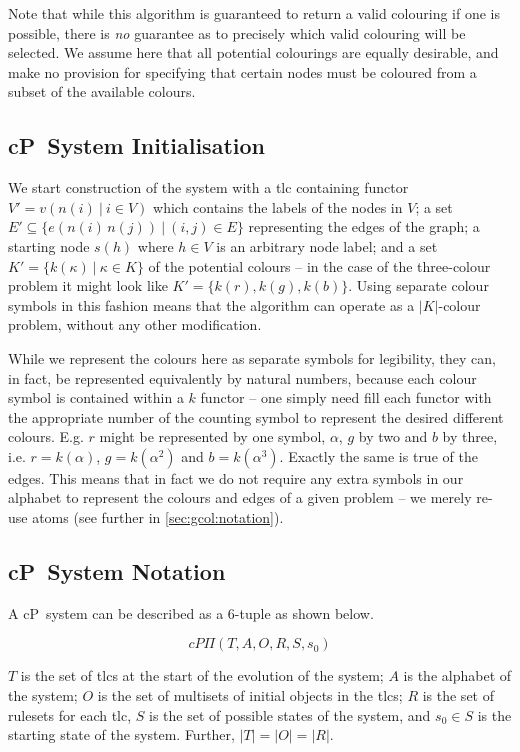 Note that while this algorithm is guaranteed to return a valid colouring if one is possible, there is \emph{no} guarantee as to precisely which valid colouring will be selected.  We assume here that all potential colourings are equally desirable, and make no provision for specifying that certain nodes must be coloured from a subset of the available colours.

\subsection{\label{sec:gcol:sysinit}cP~System Initialisation}
We start construction of the system with a \gls{tlc} containing functor \(V' = v(n(i)~|~i \in V)\) which contains the labels of the nodes in \(V\); a set \(E' \subseteq \{e(n(i)\,n(j))~|~(i,j) \in E\}\) representing the edges of the graph; a starting node \(s(h)\) where \(h \in V\) is an arbitrary node label; and a set \(K' = \{k(\kappa)~|~\kappa \in K\}\) of  the potential colours -- in the case of the three-colour problem it might look like \(K' = \{k(r), k(g), k(b)\}\). Using separate colour symbols in this fashion means that the algorithm can operate as a \(|K|\)-colour problem, without any other modification.

While we represent the colours here as separate symbols for legibility, they can, in fact, be represented equivalently by natural numbers, because each colour symbol is contained within a \(k\) functor -- one simply need fill each functor with the appropriate number of the counting symbol to represent the desired different colours.  E.g. \(r\) might be represented by one symbol, \(\alpha\), \(g\) by two and \(b\) by three, i.e. \(r = k(\alpha)\), \(g = k(\alpha^2)\) and \(b = k(\alpha^3)\).  Exactly the same is true of the edges.  This means that in fact we do not require any extra symbols in our alphabet to represent the colours and edges of a given problem -- we merely re-use atoms (see further in \autoref{sec:gcol:notation}).

\subsection{\label{sec:gcol:notation}cP~System Notation}
A cP~system can be described as a 6-tuple as shown below.

\[
cP\Pi(T, A, O, R, S, s_0)
\]

\(T\) is the set of \gls{tlc}s at the start of the evolution of the system; \(A\) is the alphabet of the system; \(O\) is the set of multisets of initial objects in the \gls{tlc}s; \(R\) is the set of rulesets for each \gls{tlc}, \(S\) is the set of possible states of the system, and \(s_0 \in S\) is the starting state of the system. Further, \(|T| = |O| = |R|\).

